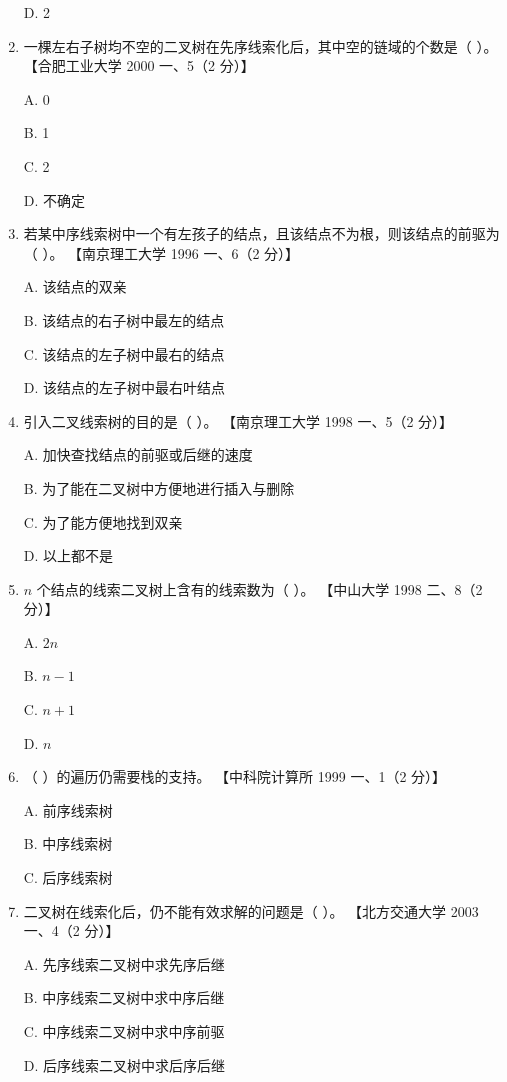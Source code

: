\documentclass[lang=cn,newtx,10pt,scheme=chinese]{../../elegantbook}
\begin{document}
\begin{enumerate}
    D. 2  

    \item 一棵左右子树均不空的二叉树在先序线索化后，其中空的链域的个数是（ ）。  
    【合肥工业大学 2000 一、5（2 分）】  

    A. 0  

    B. 1 

    C. 2  

    D. 不确定  

    \item 若某中序线索树中一个有左孩子的结点，且该结点不为根，则该结点的前驱为（ ）。  
    【南京理工大学 1996 一、6（2 分）】  

    A. 该结点的双亲  

    B. 该结点的右子树中最左的结点  

    C. 该结点的左子树中最右的结点  

    D. 该结点的左子树中最右叶结点  

    \item 引入二叉线索树的目的是（ ）。  
    【南京理工大学 1998 一、5（2 分）】

    A. 加快查找结点的前驱或后继的速度  

    B. 为了能在二叉树中方便地进行插入与删除  

    C. 为了能方便地找到双亲  

    D. 以上都不是  

    \item $n$ 个结点的线索二叉树上含有的线索数为（ ）。  
    【中山大学 1998 二、8（2 分）】  

    A. $2n$  

    B. $n - 1$  

    C. $n+1$  

    D. $n$  

    \item （ ）的遍历仍需要栈的支持。  
    【中科院计算所 1999 一、1（2 分）】  

    A. 前序线索树  

    B. 中序线索树  

    C. 后序线索树  

    \item 二叉树在线索化后，仍不能有效求解的问题是（ ）。  
    【北方交通大学 2003 一、4（2 分）】 

    A. 先序线索二叉树中求先序后继  

    B. 中序线索二叉树中求中序后继  

    C. 中序线索二叉树中求中序前驱 

    D. 后序线索二叉树中求后序后继  


\end{enumerate}
\end{document}
